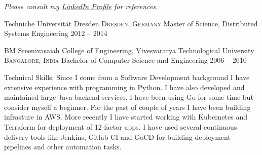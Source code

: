 \documentclass[10pt,a4paper]{article}
\begin{document}
\begin{center}
  \emph{Please consult my \href{https://de.linkedin.com/in/arnaik}{LinkedIn Profile} for references.}
\end{center}

\spacedhrule{-0.2em}{-0.4em}


\headedsection
  {Techniche Universit{\"a}t Dresden}
  {\textsc{Dresden, Germany}} {%
  \headedsubsection
    {Master of Science, Distributed Systems Engineering}
    {2012 -- 2014}
    {
    }
}

\headedsection
  {BM Sreenivasaiah College of Engineering, Vivesvararya Technological University}
  {\textsc{Bangalore, India}} {%
  \headedsubsection
    {Bachelor of Computer Science and Engineering}
    {2006 -- 2010}
    {
    }
}

\spacedhrule{1.6em}{-0.4em}


\inlineheadsection  %
  {Technical Skills:}
    {Since I come from a Software Development background I have extensive experience with programming in Python. I have also developed and maintained large Java backend services. I have been using Go for some time but consider myself a beginner. For the past of couple of years I have been building infrasture in AWS. More recently I have started working with Kubernetes and Terraform for deployment of 12-factor apps. I have used several continuous delivery tools like Jenkins, Gitlab-CI and GoCD for building deployment pipelines and other automation tasks.}
\end{document}
